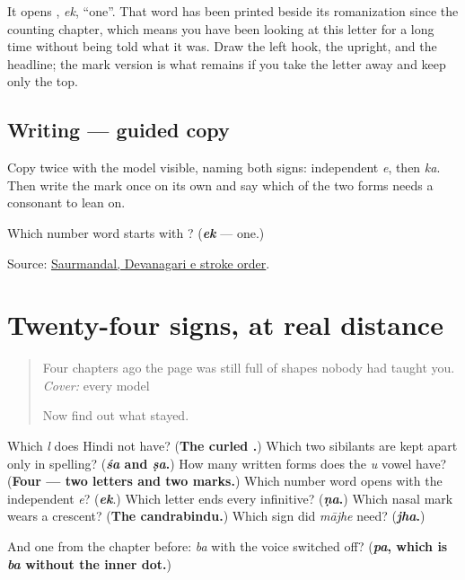 It opens \textbf{}, \emph{ek}, \textquotedblleft{}one\textquotedblright{}. That word has been printed beside its romanization since the counting chapter, which means you have been looking at this letter for a long time without being told what it was. Draw the left hook, the upright, and the headline; the mark version is what remains if you take the letter away and keep only the top.

\subsection*{Writing — guided copy}

Copy \textbf{} twice with the model visible, naming both signs: independent \emph{e}, then \emph{ka}. Then write the \textbf{} mark once on its own and say which of the two forms needs a consonant to lean on.

\begin{tcolorbox}[breakable,colback=teal!4,colframe=teal!35!black,title={Before you move on}]
Which number word starts with \textbf{}? (\emph{\textbf{ek}} — one.)

Source: \href{https://commons.wikimedia.org/wiki/File:Devanagari\_\%E0\%A4\%8F\_stroke\_order.svg}{Saurmandal, Devanagari e stroke order}.
\end{tcolorbox}
\section[\texorpdfstring{\mr{चोवीस} \mr{चिन्हे} (covīs cinhe)}{चोवीस चिन्हे (covīs cinhe)}]{Twenty-four signs, at real distance}

\label{lesson:MR-R08-runway-recall}



\begin{quote}
Four chapters ago the page was still full of shapes nobody had taught you. \emph{Cover:} every model

Now find out what stayed.
\end{quote}

\begin{tcolorbox}[breakable,colback=teal!4,colframe=teal!35!black,title={Before you move on}]
Which \emph{l} does Hindi not have? (\textbf{The curled .}) Which two sibilants are kept apart only in spelling? (\textbf{\emph{śa} and \emph{ṣa}.}) How many written forms does the \emph{u} vowel have? (\textbf{Four — two letters and two marks.}) Which number word opens with the independent \emph{e}? (\emph{\textbf{ek}}.) Which letter ends every infinitive? (\textbf{\emph{ṇa}.}) Which nasal mark wears a crescent? (\textbf{The candrabindu.}) Which sign did \emph{mājhe} need? (\textbf{\emph{jha}.})

And one from the chapter before: \emph{ba} with the voice switched off? (\textbf{\emph{pa}, which is \emph{ba} without the inner dot.})
\end{tcolorbox}
